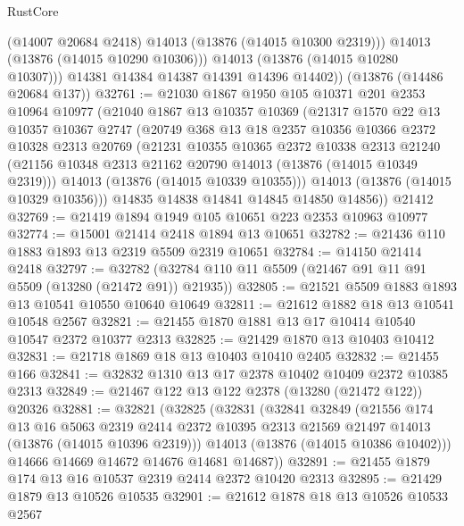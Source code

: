 \begin{lexlean}{RustCore}
\begin{coremodule}
              (@14007 @20684 @2418)
              @14013
              (@13876 (@14015 @10300 @2319)))
            @14013
            (@13876 (@14015 @10290 @10306)))
          @14013
          (@13876 (@14015 @10280 @10307)))
        @14381
        @14384
        @14387
        @14391
        @14396
        @14402))
    (@13876 (@14486 @20684 @137))
@32761 := @21030
    @1867
    @1950
    @105
    @10371
    @201
    @2353
    @10964
    @10977
    (@21040
      @1867
      @13
      @10357
      @10369
      (@21317
        @1570
        @22
        @13
        @10357
        @10367
        @2747
        (@20749
          @368
          @13
          @18
          @2357
          @10356
          @10366
          @2372
          @10328
          @2313
          @20769
          (@21231
            @10355
            @10365
            @2372
            @10338
            @2313
            @21240
            (@21156 @10348 @2313 @21162 @20790 @14013 (@13876 (@14015 @10349 @2319)))
            @14013
            (@13876 (@14015 @10339 @10355)))
          @14013
          (@13876 (@14015 @10329 @10356)))
        @14835
        @14838
        @14841
        @14845
        @14850
        @14856))
    @21412
@32769 := @21419 @1894 @1949 @105 @10651 @223 @2353 @10963 @10977
@32774 := @15001 @21414 @2418 @1894 @13 @10651
@32782 := @21436 @110 @1883 @1893 @13 @2319 @5509 @2319 @10651
@32784 := @14150 @21414 @2418
@32797 := @32782 (@32784 @110 @11 @5509 (@21467 @91 @11 @91 @5509 (@13280 (@21472 @91)) @21935))
@32805 := @21521 @5509 @1883 @1893 @13 @10541 @10550 @10640 @10649
@32811 := @21612 @1882 @18 @13 @10541 @10548 @2567
@32821 := @21455 @1870 @1881 @13 @17 @10414 @10540 @10547 @2372 @10377 @2313
@32825 := @21429 @1870 @13 @10403 @10412
@32831 := @21718 @1869 @18 @13 @10403 @10410 @2405
@32832 := @21455 @166
@32841 := @32832 @1310 @13 @17 @2378 @10402 @10409 @2372 @10385 @2313
@32849 := @21467 @122 @13 @122 @2378 (@13280 (@21472 @122)) @20326
@32881 := @32821
    (@32825
      (@32831
        (@32841
          @32849
          (@21556
            @174
            @13
            @16
            @5063
            @2319
            @2414
            @2372
            @10395
            @2313
            @21569
            @21497
            @14013
            (@13876 (@14015 @10396 @2319)))
          @14013
          (@13876 (@14015 @10386 @10402)))
        @14666
        @14669
        @14672
        @14676
        @14681
        @14687))
@32891 := @21455 @1879 @174 @13 @16 @10537 @2319 @2414 @2372 @10420 @2313
@32895 := @21429 @1879 @13 @10526 @10535
@32901 := @21612 @1878 @18 @13 @10526 @10533 @2567

\end{coremodule}
\end{lexlean}
